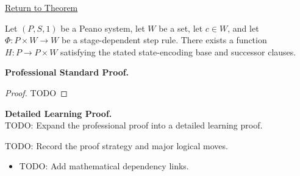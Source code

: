 \newpage
{}
\label{prf:general-recursion-by-state-encoding}

\begin{remark*}[Return]
\hyperref[thm:general-recursion-by-state-encoding]{Return to Theorem}
\end{remark*}

\begin{theorem*}
Let $(P,S,1)$ be a Peano system, let $W$ be a set, let $c\in W$, and let
$\Phi:P\times W\to W$ be a stage-dependent step rule. There exists a function
$H:P\to P\times W$ satisfying the stated state-encoding base and successor
clauses.
\end{theorem*}

\textbf{Professional Standard Proof.}~\\
\begin{proof}
TODO
\end{proof}

\textbf{Detailed Learning Proof.}~\\
TODO: Expand the professional proof into a detailed learning proof.

\begin{remark*}
TODO: Record the proof strategy and major logical moves.
\end{remark*}

\begin{dependencies}
\begin{itemize}
  \item TODO: Add mathematical dependency links.
\end{itemize}
\end{dependencies}
